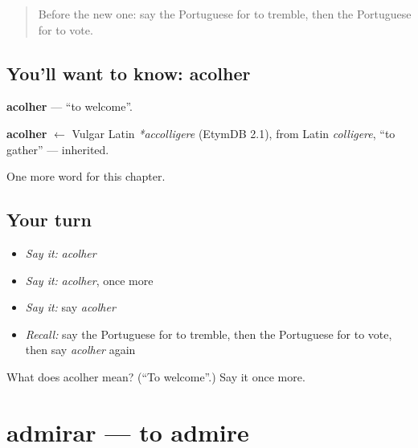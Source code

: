 \label{lesson:PT-C146-acolher}



\begin{quote}
Before the new one: say the Portuguese for to tremble, then the Portuguese for to vote.
\end{quote}

\subsection*{You'll want to know: acolher}
\textbf{acolher} — \textquotedblleft{}to welcome\textquotedblright{}.

\begin{cousinweb}
\textbf{acolher} $\leftarrow$ Vulgar Latin \emph{*accolligere} (EtymDB 2.1), from Latin \emph{colligere}, \textquotedblleft{}to gather\textquotedblright{} — inherited.
\end{cousinweb}

\begin{grammarlens}[title={What you've built}]
One more word for this chapter.
\end{grammarlens}

\subsection*{Your turn}
\begin{itemize}
\raggedright
  \item \emph{Say it:} \emph{acolher}
  \item \emph{Say it:} \emph{acolher}, once more
  \item \emph{Say it:} say \emph{acolher}
  \item \emph{Recall:} say the Portuguese for to tremble, then the Portuguese for to vote, then say \emph{acolher} again
\end{itemize}

\begin{tcolorbox}[breakable,colback=teal!4,colframe=teal!35!black,title={Before you move on}]
What does acolher mean? (\textquotedblleft{}To welcome\textquotedblright{}.) Say it once more.
\end{tcolorbox}
\section[admirar]{admirar — to admire}

\label{lesson:PT-C146-admirar}



